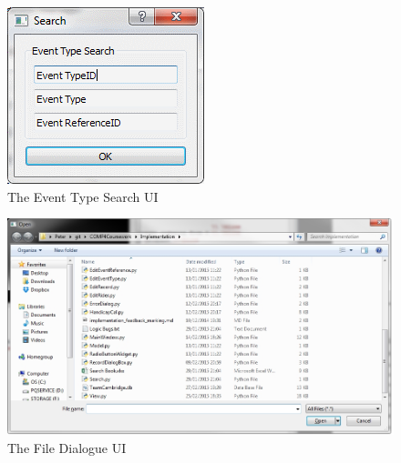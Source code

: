 \begin{figure}
\includegraphics[width=\textwidth]{./Maintenance/UI/EventTypeSearch.png}
\caption{The Event Type Search UI} \label{fig:EventTypeSearch_UI}
\end{figure}

\begin{figure}
\includegraphics[width=\textwidth]{./Maintenance/UI/FileDia.png}
\caption{The File Dialogue UI} \label{fig:FileDia_UI}
\end{figure}

